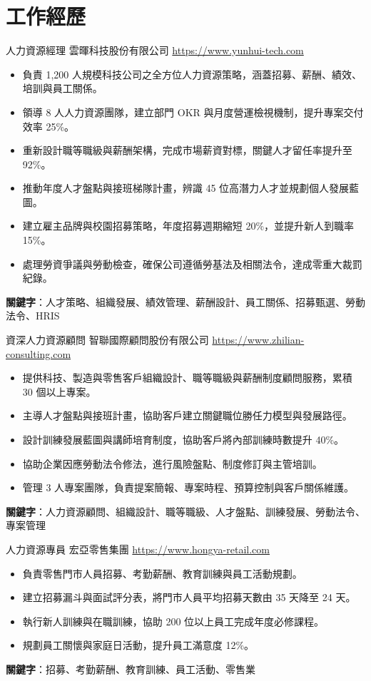 \documentclass[a4paper, serif, 10pt]{moderncv}
\begin{document}
\section{工作經歷}

        {人力資源經理}
        {雲暉科技股份有限公司}
        {\url{https://www.yunhui-tech.com}}
        {}
        {\begin{itemize}
\item 負責 1,200 人規模科技公司之全方位人力資源策略，涵蓋招募、薪酬、績效、培訓與員工關係。
\item 領導 8 人人力資源團隊，建立部門 OKR 與月度營運檢視機制，提升專案交付效率 25\%。
\item 重新設計職等職級與薪酬架構，完成市場薪資對標，關鍵人才留任率提升至 92\%。
\item 推動年度人才盤點與接班梯隊計畫，辨識 45 位高潛力人才並規劃個人發展藍圖。
\item 建立雇主品牌與校園招募策略，年度招募週期縮短 20\%，並提升新人到職率 15\%。
\item 處理勞資爭議與勞動檢查，確保公司遵循勞基法及相關法令，達成零重大裁罰紀錄。
\end{itemize}
\textbf{關鍵字}：人才策略、組織發展、績效管理、薪酬設計、員工關係、招募甄選、勞動法令、HRIS}

        {資深人力資源顧問}
        {智聯國際顧問股份有限公司}
        {\url{https://www.zhilian-consulting.com}}
        {}
        {\begin{itemize}
\item 提供科技、製造與零售客戶組織設計、職等職級與薪酬制度顧問服務，累積 30 個以上專案。
\item 主導人才盤點與接班計畫，協助客戶建立關鍵職位勝任力模型與發展路徑。
\item 設計訓練發展藍圖與講師培育制度，協助客戶將內部訓練時數提升 40\%。
\item 協助企業因應勞動法令修法，進行風險盤點、制度修訂與主管培訓。
\item 管理 3 人專案團隊，負責提案簡報、專案時程、預算控制與客戶關係維護。
\end{itemize}
\textbf{關鍵字}：人力資源顧問、組織設計、職等職級、人才盤點、訓練發展、勞動法令、專案管理}

        {人力資源專員}
        {宏亞零售集團}
        {\url{https://www.hongya-retail.com}}
        {}
        {\begin{itemize}
\item 負責零售門市人員招募、考勤薪酬、教育訓練與員工活動規劃。
\item 建立招募漏斗與面試評分表，將門市人員平均招募天數由 35 天降至 24 天。
\item 執行新人訓練與在職訓練，協助 200 位以上員工完成年度必修課程。
\item 規劃員工關懷與家庭日活動，提升員工滿意度 12\%。
\end{itemize}
\textbf{關鍵字}：招募、考勤薪酬、教育訓練、員工活動、零售業}
\end{document}
